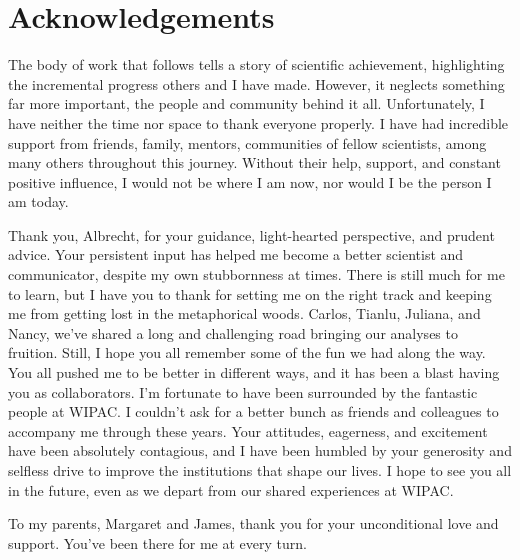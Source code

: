 \documentclass[oneside, letterpaper, 10pt, oldfontcommands]{memoir}
\begin{document}
\frontmatter

\thetitlepage
\cleardoublepage
\setcounter{page}{1}


\section{Acknowledgements}

The body of work that follows tells a story of scientific achievement, highlighting the incremental progress others and I have made. However, it neglects something far more important, the people and community behind it all. Unfortunately, I have neither the time nor space to thank everyone properly. I have had incredible support from friends, family, mentors, communities of fellow scientists, among many others throughout this journey. Without their help, support, and constant positive influence, I would not be where I am now, nor would I be the person I am today.

Thank you, Albrecht, for your guidance, light-hearted perspective, and prudent advice. Your persistent input has helped me become a better scientist and communicator, despite my own stubbornness at times. There is still much for me to learn, but I have you to thank for setting me on the right track and keeping me from getting lost in the metaphorical woods. Carlos, Tianlu, Juliana, and Nancy, we've shared a long and challenging road bringing our analyses to fruition. Still, I hope you all remember some of the fun we had along the way. You all pushed me to be better in different ways, and it has been a blast having you as collaborators. I'm fortunate to have been surrounded by the fantastic people at WIPAC. I couldn't ask for a better bunch as friends and colleagues to accompany me through these years. Your attitudes, eagerness, and excitement have been absolutely contagious, and I have been humbled by your generosity and selfless drive to improve the institutions that shape our lives. I hope to see you all in the future, even as we depart from our shared experiences at WIPAC.

To my parents, Margaret and James, thank you for your unconditional love and support. You've been there for me at every turn.

\clearpage
\tableofcontents\clearpage
\end{document}
